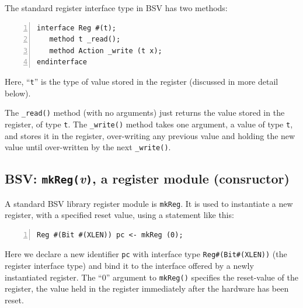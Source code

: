 
The standard register interface type in BSV has two methods:

\begin{Verbatim}[frame=single, numbers=left]
interface Reg #(t);
   method t _read();
   method Action _write (t x);
endinterface
\end{Verbatim}

Here, ``\verb|t|'' is the type of value stored in the register
(discussed in more detail below).

The \verb|_read()| method (with no arguments) just returns the value
stored in the register, of type \verb|t|.  The \verb|_write()| method
takes one argument, a value of type \verb|t|, and stores it in the
register, over-writing any previous value and holding the new value
until over-written by the next \verb|_write()|.


\subsection{BSV: {\tt mkReg(}\emph{v}{\tt )}, a register module (consructor)}




A standard BSV library register module is \verb|mkReg|.  It is used to
instantiate a new register, with a specified reset value, using a
statement like this:


\begin{Verbatim}[frame=single, numbers=left]
    Reg #(Bit #(XLEN)) pc <- mkReg (0);
\end{Verbatim}

Here we declare a new identifier \verb|pc| with interface type
\verb|Reg#(Bit#(XLEN))| (the register interface type) and bind it to
the interface offered by a newly instantiated register.  The ``0''
argument to \verb|mkReg()| specifies the reset-value of the register,
{\ie} the value held in the register immediately after the hardware
has been reset.


